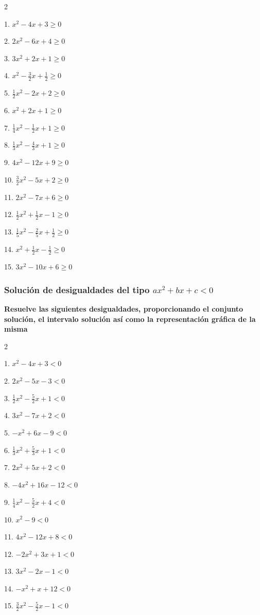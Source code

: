 \documentclass[12pt]{article}
\begin{document}
\begin{multicols}{2}

1. $x^2-4x+3\geq 0$

2. $2x^2-6x+4\geq 0$

3. $3x^2+2x+1\geq 0$

4. $x^2-\frac{3}{2}x+\frac{1}{2}\geq 0$

5. $\frac{1}{2}x^2-2x+2\geq 0$

6. $x^2+2x+1\geq 0$

7. $\frac{1}{4}x^2-\frac{1}{2}x+1\geq 0$

8. $\frac{1}{3}x^2-\frac{4}{3}x+1\geq 0$

9. $4x^2-12x+9\geq 0$

10. $\frac{3}{2}x^2-5x+2\geq 0$

11. $2x^2-7x+6\geq 0$

12. $\frac{1}{2}x^2+\frac{1}{2}x-1\geq 0$

13. $\frac{1}{5}x^2-\frac{2}{5}x+\frac{1}{2}\geq 0$

14. $x^2+\frac{1}{2}x-\frac{1}{2}\geq 0$

15. $3x^2-10x+6\geq 0$

\end{multicols}

\subsubsection{\texorpdfstring{Solución de desigualdades del tipo
\(ax^2+bx+c<0\)}{Solución de desigualdades del tipo ax\^{}2+bx+c\textless0}}\label{soluciuxf3n-de-desigualdades-del-tipo-ax2bxc0-1}
\textbf{Resuelve las siguientes desigualdades, proporcionando el
conjunto solución, el intervalo solución así como la representación
gráfica de la misma}

\begin{multicols}{2}

1. $x^2-4x+3<0$

2. $2x^2-5x-3<0$

3. $\frac{1}{2}x^2-\frac{5}{2}x+1<0$

4. $3x^2-7x+2<0$

5. $-x^2+6x-9<0$

6. $\frac{1}{3}x^2+\frac{5}{3}x+1<0$

7. $2x^2+5x+2<0$

8. $-4x^2+16x-12<0$

9. $\frac{1}{4}x^2-\frac{5}{2}x+4<0$

10. $x^2-9<0$

11. $4x^2-12x+8<0$

12. $-2x^2+3x+1<0$

13. $3x^2-2x-1<0$

14. $-x^2+x+12<0$

15. $\frac{3}{2}x^2-\frac{5}{2}x-1<0$

\end{multicols}
\end{document}

